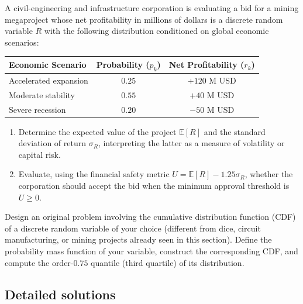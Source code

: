 \begin{problema}
	\label{prob:d332420}
	A civil-engineering and infrastructure corporation is evaluating a bid for a mining megaproject whose net profitability in millions of dollars is a discrete random variable $R$ with the following distribution conditioned on global economic scenarios:
	\begin{center}
		\begin{tabular}{l|cc}
			\hline
			\textbf{Economic Scenario} & \textbf{Probability ($p_k$)} & \textbf{Net Profitability ($r_k$)} \\
			\hline
			Accelerated expansion & $0.25$ & $+120$ M USD \\
			Moderate stability & $0.55$ & $+40$ M USD \\
			Severe recession & $0.20$ & $-50$ M USD \\
			\hline
		\end{tabular}
	\end{center}
	\begin{enumerate}
		\item Determine the expected value of the project $\mathbb{E}[R]$ and the standard deviation of return $\sigma_R$, interpreting the latter as a measure of volatility or capital risk.
		\item Evaluate, using the financial safety metric $U = \mathbb{E}[R] - 1.25\sigma_R$, whether the corporation should accept the bid when the minimum approval threshold is $U \ge 0$.
	\end{enumerate}
\end{problema}

\begin{problema}
	\label{prob:e538b1b}
	Design an original problem involving the cumulative distribution function (CDF) of a discrete random variable of your choice (different from dice, circuit manufacturing, or mining projects already seen in this section). Define the probability mass function of your variable, construct the corresponding CDF, and compute the order-$0.75$ quantile (third quartile) of its distribution.
\end{problema}

\subsection*{Detailed solutions}

